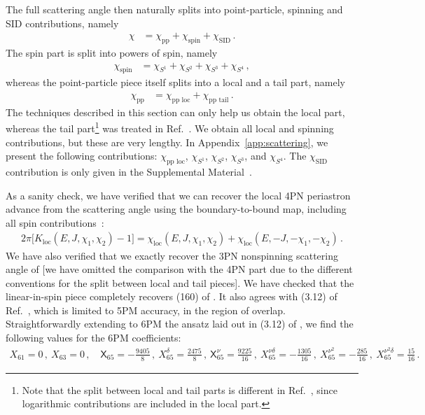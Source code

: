 \documentclass[prd,superscriptaddress,preprintnumbers,tightenlines,nofootinbib, eqsecnum]{revtex4-2}
\begin{document}
The full scattering angle then naturally splits into point-particle, spinning and SID contributions, namely
\begin{align}
    \chi&= \chi_\text{pp}+\chi_\text{spin} + \chi_\text{SID}\,.
\end{align}
The spin part is split into powers of spin, namely 
\begin{align}
    \chi_\text{spin} &= \chi_{S^1} + \chi_{S^2} + \chi_{S^3} +\chi_{S^4} \,,
\end{align}
whereas the point-particle piece itself splits into a local and a tail part, namely
\begin{align}
    \chi_\text{pp} &=  \chi_\text{pp loc}+\chi_\text{pp tail}\,.
\end{align}
The techniques described in this section can only help us obtain the local part, whereas the tail part\footnote{Note that the split between local and tail parts is different in Ref.~\cite{Bini:2017wfr}, since logarithmic contributions are included in the local part.} was treated in Ref.~\cite{Bini:2017wfr}. We obtain all local and spinning contributions, but these are very lengthy. In Appendix~\ref{app:scattering}, we present the following contributions: $\chi_\text{pp loc}$, $\chi_{S^1}$, $\chi_{S^2}$, $\chi_{S^3}$, and $\chi_{S^4}$. The $\chi_\text{SID}$ contribution is only given in the Supplemental Material~\cite{Supplemental}.
%
%


As a sanity check, we have verified that we can recover the local 4PN periastron advance from the scattering angle using the boundary-to-bound map, including all spin contributions~\cite{Kalin:2019inp}:
\begin{align}
    2\pi\Big[K_\text{loc}(E,J,\chi_1,\chi_2)-1\Big]=\chi_\text{loc}(E,J,\chi_1,\chi_2)+\chi_\text{loc}(E,-J,-\chi_1,-\chi_2) \,.
\end{align}
%
We have also verified that we exactly recover the 3PN nonspinning scattering angle of \cite{Bini:2017wfr} [we have omitted the comparison with the 4PN part due to the different conventions for the split between local and tail pieces]. We have checked that the linear-in-spin piece completely recovers (160) of \cite{Bini:2017wfr}. It also agrees with (3.12) of Ref.~\cite{Khalil:2021fpm}, which is limited to 5PM accuracy, in the region of overlap. Straightforwardly extending to 6PM the ansatz laid out in (3.12) of \cite{Khalil:2021fpm}, we find the following values for the 6PM coefficients: 
\begin{align}
{X}_{61} =0 \,, \  
X_{63} = 0\,,  \quad\mathsf{X}_{65} = -\frac{9405}{8}\,, \ 
{X}_{65}^{\delta} = \frac{2475}{8}\,, \ 
\mathsf{X}_{65}^{\nu} = \frac{9225}{16}\,, \ 
{X}_{65}^{\nu\delta} = -\frac{1305}{16}\,, \ 
{X}_{65}^{\nu^{2}} = -\frac{285}{16}\,, \  
{X}_{65}^{\nu^{2}\delta} = \frac{15}{16} \,.
\end{align}
%
\end{document}
